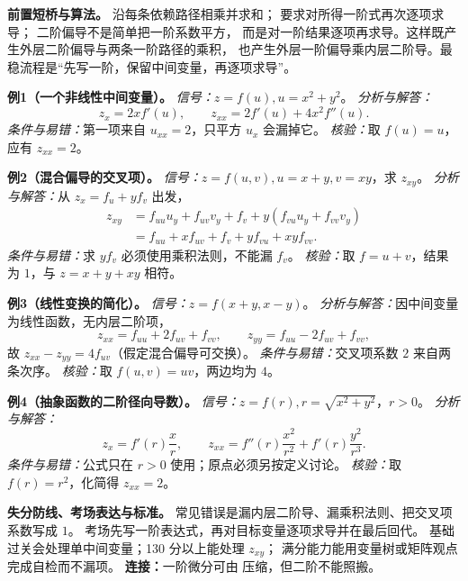 
\begin{knowledgeBox}
\textbf{前置短桥与算法。}
沿每条依赖路径相乘并求和；
要求对所得一阶式再次逐项求导；
二阶偏导不是简单把一阶系数平方，
而是对一阶结果逐项再求导。这样既产生外层二阶偏导与两条一阶路径的乘积，
也产生外层一阶偏导乘内层二阶导。最稳流程是“先写一阶，保留中间变量，再逐项求导”。

\textbf{例1（一个非线性中间变量）。}
\emph{信号：}\(z=f(u),u=x^2+y^2\)。
\emph{分析与解答：}
\[
z_x=2xf'(u),\qquad
z_{xx}=2f'(u)+4x^2f''(u).
\]
\emph{条件与易错：}第一项来自 \(u_{xx}=2\)，只平方 \(u_x\) 会漏掉它。
\emph{核验：}取 \(f(u)=u\)，应有 \(z_{xx}=2\)。

\textbf{例2（混合偏导的交叉项）。}
\emph{信号：}\(z=f(u,v),u=x+y,v=xy\)，求 \(z_{xy}\)。
\emph{分析与解答：}从 \(z_x=f_u+yf_v\) 出发，
\[
\begin{aligned}
z_{xy}
&=f_{uu}u_y+f_{uv}v_y+f_v
 +y(f_{vu}u_y+f_{vv}v_y)\\
&=f_{uu}+x f_{uv}+f_v+y f_{vu}+xy f_{vv}.
\end{aligned}
\]
\emph{条件与易错：}求 \(y f_v\) 必须使用乘积法则，不能漏 \(f_v\)。
\emph{核验：}取 \(f=u+v\)，结果为 \(1\)，与 \(z=x+y+xy\) 相符。

\textbf{例3（线性变换的简化）。}
\emph{信号：}\(z=f(x+y,x-y)\)。
\emph{分析与解答：}因中间变量为线性函数，无内层二阶项，
\[
z_{xx}=f_{uu}+2f_{uv}+f_{vv},\qquad
z_{yy}=f_{uu}-2f_{uv}+f_{vv},
\]
故 \(z_{xx}-z_{yy}=4f_{uv}\)（假定混合偏导可交换）。
\emph{条件与易错：}交叉项系数 \(2\) 来自两条次序。
\emph{核验：}取 \(f(u,v)=uv\)，两边均为 \(4\)。

\textbf{例4（抽象函数的二阶径向导数）。}
\emph{信号：}\(z=f(r),r=\sqrt{x^2+y^2}\)，\(r>0\)。
\emph{分析与解答：}
\[
z_x=f'(r)\frac{x}{r},\qquad
z_{xx}=f''(r)\frac{x^2}{r^2}
+f'(r)\frac{y^2}{r^3}.
\]
\emph{条件与易错：}公式只在 \(r>0\) 使用；原点必须另按定义讨论。
\emph{核验：}取 \(f(r)=r^2\)，化简得 \(z_{xx}=2\)。

\textbf{失分防线、考场表达与标准。}
常见错误是漏内层二阶导、漏乘积法则、把交叉项系数写成 \(1\)。
考场先写一阶表达式，再对目标变量逐项求导并在最后回代。
基础过关会处理单中间变量；130 分以上能处理 \(z_{xy}\)；
满分能力能用变量树或矩阵观点完成自检而不漏项。
\textbf{连接：}一阶微分可由
压缩，但二阶不能照搬。
\end{knowledgeBox}

